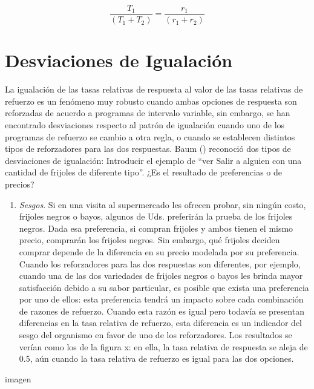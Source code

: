 \documentclass[
  a4paper,
  DIV=11,
  numbers=noendperiod]{scrreprt}
\providecommand{\tightlist}{%
  \setlength{\itemsep}{0pt}\setlength{\parskip}{0pt}}\usepackage{longtable,booktabs,array}
\begin{document}
\[\frac {T_1} {(T_1 + T_2)} = \frac {r_1} {(r_1 + r_2)}\]

\section{Desviaciones de
Igualación}\label{desviaciones-de-igualaciuxf3n}

La igualación de las tasas relativas de respuesta al valor de las tasas
relativas de refuerzo es un fenómeno muy robusto cuando ambas opciones
de respuesta son reforzadas de acuerdo a programas de intervalo
variable, sin embargo, se han encontrado desviaciones respecto al patrón
de igualación cuando uno de los programas de refuerzo se cambio a otra
regla, o cuando se establecen distintos tipos de reforzadores para las
dos respuestas. Baum () reconoció dos tipos de desviaciones de
igualación: Introducir el ejemplo de ``ver Salir a alguien con una
cantidad de frijoles de diferente tipo''. ¿Es el resultado de
preferencias o de precios?

\begin{enumerate}
\def\labelenumi{\arabic{enumi}.}
\tightlist
\item
  \emph{Sesgos}. Si en una visita al supermercado les ofrecen probar,
  sin ningún costo, frijoles negros o bayos, algunos de Uds. preferirán
  la prueba de los frijoles negros. Dada esa preferencia, si compran
  frijoles y ambos tienen el mismo precio, comprarán los frijoles
  negros. Sin embargo, qué frijoles deciden comprar depende de la
  diferencia en su precio modelada por su preferencia. Cuando los
  reforzadores para las dos respuestas son diferentes, por ejemplo,
  cuando una de las dos variedades de frijoles negros o bayos les brinda
  mayor satisfacción debido a su sabor particular, es posible que exista
  una preferencia por uno de ellos: esta preferencia tendrá un impacto
  sobre cada combinación de razones de refuerzo. Cuando esta razón es
  igual pero todavía se presentan diferencias en la tasa relativa de
  refuerzo, esta diferencia es un indicador del sesgo del organismo en
  favor de uno de los reforzadores. Los resultados se verían como los de
  la figura x: en ella, la tasa relativa de respuesta se aleja de 0.5,
  aún cuando la tasa relativa de refuerzo es igual para las dos
  opciones.
\end{enumerate}

imagen
\end{document}
